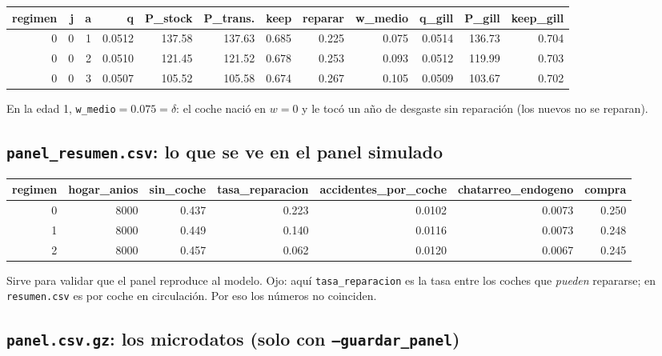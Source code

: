 \documentclass[11pt]{article}
\newcommand{\col}[1]{\texttt{#1}}
\newcommand{\archivo}[1]{\textbf{\texttt{#1}}}
\begin{document}
\begin{center}\footnotesize
\begin{adjustbox}{max width=\textwidth}\begin{tabular}{rrrrrrrrrrrr}
\toprule
regimen & j & a & q & P\_stock & P\_trans. & keep & reparar & w\_medio & q\_gill & P\_gill & keep\_gill\\
\midrule
0 & 0 & 1 & 0.0512 & 137.58 & 137.63 & 0.685 & 0.225 & 0.075 & 0.0514 & 136.73 & 0.704\\
0 & 0 & 2 & 0.0510 & 121.45 & 121.52 & 0.678 & 0.253 & 0.093 & 0.0512 & 119.99 & 0.703\\
0 & 0 & 3 & 0.0507 & 105.52 & 105.58 & 0.674 & 0.267 & 0.105 & 0.0509 & 103.67 & 0.702\\
\bottomrule
\end{tabular}\end{adjustbox}
\end{center}
En la edad 1, \col{w\_medio}$=0.075=\delta$: el coche nació en $w=0$ y le tocó un año de
desgaste sin reparación (los nuevos no se reparan).

\subsection{\archivo{panel\_resumen.csv}: lo que se ve en el panel simulado}

\begin{center}\footnotesize
\begin{adjustbox}{max width=\textwidth}\begin{tabular}{rrrrrrr}
\toprule
regimen & hogar\_anios & sin\_coche & tasa\_reparacion & accidentes\_por\_coche & chatarreo\_endogeno & compra\\
\midrule
0 & 8000 & 0.437 & 0.223 & 0.0102 & 0.0073 & 0.250\\
1 & 8000 & 0.449 & 0.140 & 0.0116 & 0.0073 & 0.248\\
2 & 8000 & 0.457 & 0.062 & 0.0120 & 0.0067 & 0.245\\
\bottomrule
\end{tabular}\end{adjustbox}
\end{center}
Sirve para validar que el panel reproduce al modelo. Ojo: aquí \col{tasa\_reparacion} es la
tasa entre los coches que \emph{pueden} repararse; en \texttt{resumen.csv} es por coche en
circulación. Por eso los números no coinciden.

\subsection{\archivo{panel.csv.gz}: los microdatos (solo con \texttt{--guardar\_panel})}
\end{document}
